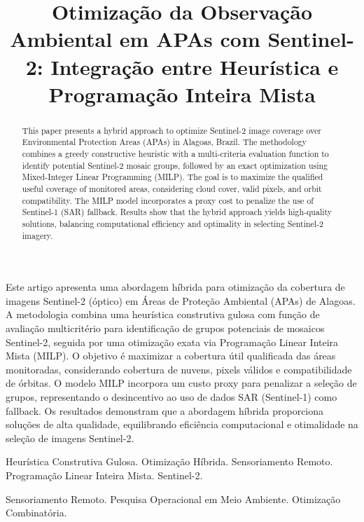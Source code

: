 \documentclass[a4paper,11pt]{article}
\begin{document}
\title{Otimização da Observação Ambiental em APAs com Sentinel-2: Integração entre Heurística e Programação Inteira Mista}

\maketitle
\thispagestyle{fancy}

\vspace{8mm}
\begin{resumo}
Este artigo apresenta uma abordagem híbrida para otimização da cobertura de imagens Sentinel-2 (óptico) em Áreas de Proteção Ambiental (APAs) de Alagoas. A metodologia combina uma heurística construtiva gulosa com função de avaliação multicritério para identificação de grupos potenciais de mosaicos Sentinel-2, seguida por uma otimização exata via Programação Linear Inteira Mista (MILP). O objetivo é maximizar a cobertura útil qualificada das áreas monitoradas, considerando cobertura de nuvens, pixels válidos e compatibilidade de órbitas. O modelo MILP incorpora um custo proxy para penalizar a seleção de grupos, representando o desincentivo ao uso de dados SAR (Sentinel-1) como fallback. Os resultados demonstram que a abordagem híbrida proporciona soluções de alta qualidade, equilibrando eficiência computacional e otimalidade na seleção de imagens Sentinel-2.
\end{resumo}

\bigskip
\begin{palchaves}
Heurística Construtiva Gulosa. Otimização Híbrida. Sensoriamento Remoto. Programação Linear Inteira Mista. Sentinel-2.

\bigskip
Sensoriamento Remoto. Pesquisa Operacional em Meio Ambiente. Otimização Combinatória.
\end{palchaves}

\vspace{8mm}

\begin{abstract}
This paper presents a hybrid approach to optimize Sentinel-2 image coverage over Environmental Protection Areas (APAs) in Alagoas, Brazil. The methodology combines a greedy constructive heuristic with a multi-criteria evaluation function to identify potential Sentinel-2 mosaic groups, followed by an exact optimization using Mixed-Integer Linear Programming (MILP). The goal is to maximize the qualified useful coverage of monitored areas, considering cloud cover, valid pixels, and orbit compatibility. The MILP model incorporates a proxy cost to penalize the use of Sentinel-1 (SAR) fallback. Results show that the hybrid approach yields high-quality solutions, balancing computational efficiency and optimality in selecting Sentinel-2 imagery.
\end{abstract}
\end{document}
